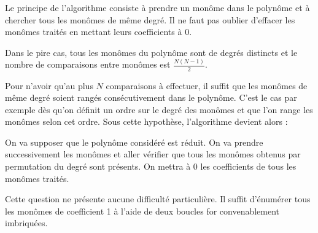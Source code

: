 Le principe de l'algorithme consiste à prendre un monôme dans le polynôme et à chercher tous les monômes de même degré. Il ne faut pas oublier \og d'effacer \fg{} les monômes traités en mettant leurs coefficients à 0.



Dans le pire cas, tous les monômes du polynôme sont de degrés distincts et le nombre de comparaisons entre monômes est $\frac{N(N-1)}{2}$.

\Q
Pour n'avoir qu'au plus $N$ comparaisons à effectuer, il suffit que les monômes de même degré soient rangés consécutivement dans le polynôme. C'est le cas par exemple dès qu'on définit un ordre sur le degré des monômes et que l'on range les monômes selon cet ordre. Sous cette hypothèse, l'algorithme devient alors :



\Q
On va supposer que le polynôme considéré est réduit. On va prendre successivement les monômes et aller vérifier que tous les monômes obtenus par permutation du degré sont présents. On mettra à 0 les coefficients de tous les monômes traités.



\Q
Cette question ne présente aucune difficulté particulière. Il suffit d'énumérer tous les monômes de coefficient 1 à l'aide de deux boucles \og for \fg{} convenablement imbriquées.



\Fin
